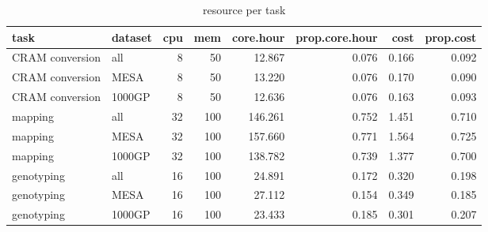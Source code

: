 \begin{table}

\caption{\label{tab:unnamed-chunk-5}resource per task}
\centering
\begin{tabular}[t]{l|l|r|r|r|r|r|r}
\hline
task & dataset & cpu & mem & core.hour & prop.core.hour & cost & prop.cost\\
\hline
CRAM conversion & all & 8 & 50 & 12.867 & 0.076 & 0.166 & 0.092\\
\hline
CRAM conversion & MESA & 8 & 50 & 13.220 & 0.076 & 0.170 & 0.090\\
\hline
CRAM conversion & 1000GP & 8 & 50 & 12.636 & 0.076 & 0.163 & 0.093\\
\hline
mapping & all & 32 & 100 & 146.261 & 0.752 & 1.451 & 0.710\\
\hline
mapping & MESA & 32 & 100 & 157.660 & 0.771 & 1.564 & 0.725\\
\hline
mapping & 1000GP & 32 & 100 & 138.782 & 0.739 & 1.377 & 0.700\\
\hline
genotyping & all & 16 & 100 & 24.891 & 0.172 & 0.320 & 0.198\\
\hline
genotyping & MESA & 16 & 100 & 27.112 & 0.154 & 0.349 & 0.185\\
\hline
genotyping & 1000GP & 16 & 100 & 23.433 & 0.185 & 0.301 & 0.207\\
\hline
\end{tabular}
\end{table}